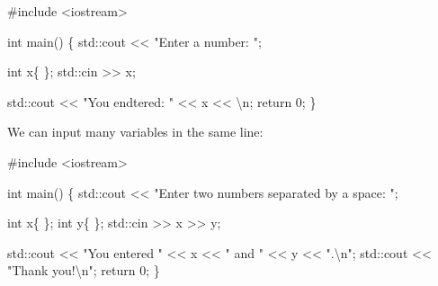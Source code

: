 \documentclass[
  letterpaper,
  DIV=11,
  numbers=noendperiod]{scrreprt}
\newenvironment{Shaded}{\begin{snugshade}}{\end{snugshade}}
\newcommand{\CommentTok}[1]{\textcolor[rgb]{0.37,0.37,0.37}{#1}}
\newcommand{\DecValTok}[1]{\textcolor[rgb]{0.68,0.00,0.00}{#1}}
\newcommand{\ErrorTok}[1]{\textcolor[rgb]{0.68,0.00,0.00}{#1}}
\newcommand{\FunctionTok}[1]{\textcolor[rgb]{0.28,0.35,0.67}{#1}}
\newcommand{\NormalTok}[1]{\textcolor[rgb]{0.00,0.23,0.31}{#1}}
\newcommand{\SpecialCharTok}[1]{\textcolor[rgb]{0.37,0.37,0.37}{#1}}
\newcommand{\StringTok}[1]{\textcolor[rgb]{0.13,0.47,0.30}{#1}}
\begin{document}
\begin{Shaded}
\begin{Highlighting}[]
\CommentTok{\#include \textless{}iostream\textgreater{}}

\NormalTok{int }\FunctionTok{main}\NormalTok{()}
\NormalTok{\{}
\NormalTok{    std}\SpecialCharTok{::}\NormalTok{cout }\SpecialCharTok{\textless{}}\ErrorTok{\textless{}} \StringTok{"Enter a number: "}\NormalTok{;}
    
\NormalTok{    int x\{ \};}
\NormalTok{    std}\SpecialCharTok{::}\NormalTok{cin }\SpecialCharTok{\textgreater{}}\ErrorTok{\textgreater{}}\NormalTok{ x;}

\NormalTok{    std}\SpecialCharTok{::}\NormalTok{cout }\SpecialCharTok{\textless{}}\ErrorTok{\textless{}} \StringTok{"You endtered: "} \SpecialCharTok{\textless{}}\ErrorTok{\textless{}}\NormalTok{ x }\SpecialCharTok{\textless{}}\ErrorTok{\textless{}} \StringTok{\textquotesingle{}}\SpecialCharTok{\textbackslash{}n}\StringTok{\textquotesingle{}}\NormalTok{;}
\NormalTok{    return }\DecValTok{0}\NormalTok{;}
\NormalTok{\}}
\end{Highlighting}
\end{Shaded}

We can input many variables in the same line:

\begin{Shaded}
\begin{Highlighting}[]
\CommentTok{\#include \textless{}iostream\textgreater{}}

\NormalTok{int }\FunctionTok{main}\NormalTok{()}
\NormalTok{\{}
\NormalTok{    std}\SpecialCharTok{::}\NormalTok{cout }\SpecialCharTok{\textless{}}\ErrorTok{\textless{}} \StringTok{"Enter two numbers separated by a space: "}\NormalTok{;}
    
\NormalTok{    int x\{ \};}
\NormalTok{    int y\{ \};}
\NormalTok{    std}\SpecialCharTok{::}\NormalTok{cin }\SpecialCharTok{\textgreater{}}\ErrorTok{\textgreater{}}\NormalTok{ x }\SpecialCharTok{\textgreater{}}\ErrorTok{\textgreater{}}\NormalTok{ y;}

\NormalTok{    std}\SpecialCharTok{::}\NormalTok{cout }\SpecialCharTok{\textless{}}\ErrorTok{\textless{}} \StringTok{"You entered "} \SpecialCharTok{\textless{}}\ErrorTok{\textless{}}\NormalTok{ x }\SpecialCharTok{\textless{}}\ErrorTok{\textless{}} \StringTok{" and "} \SpecialCharTok{\textless{}}\ErrorTok{\textless{}}\NormalTok{ y }\SpecialCharTok{\textless{}}\ErrorTok{\textless{}} \StringTok{".}\SpecialCharTok{\textbackslash{}n}\StringTok{"}\NormalTok{;}
\NormalTok{    std}\SpecialCharTok{::}\NormalTok{cout }\SpecialCharTok{\textless{}}\ErrorTok{\textless{}} \StringTok{"Thank you!}\SpecialCharTok{\textbackslash{}n}\StringTok{"}\NormalTok{;}
\NormalTok{    return }\DecValTok{0}\NormalTok{;}
\NormalTok{\}}
\end{Highlighting}
\end{Shaded}
\end{document}
